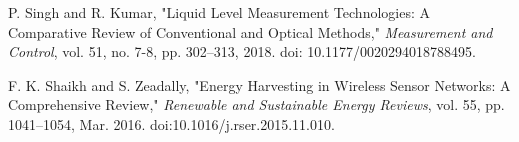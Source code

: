 \documentclass[conference]{IEEEtran}
\begin{document}
\begin{thebibliography}{00}
P. Singh and R. Kumar, "Liquid Level Measurement Technologies: A Comparative Review of Conventional and Optical Methods," \emph{Measurement and Control}, vol. 51, no. 7-8, pp. 302--313, 2018. doi: 10.1177/0020294018788495.

F. K. Shaikh and S. Zeadally, "Energy Harvesting in Wireless Sensor Networks: A Comprehensive Review," \emph{Renewable and Sustainable Energy Reviews}, vol. 55, pp. 1041--1054, Mar. 2016. doi:10.1016/j.rser.2015.11.010.

\end{thebibliography}



\end{document}
